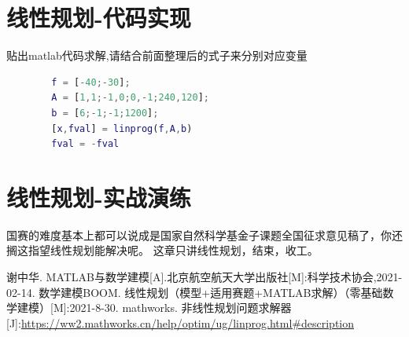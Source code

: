 \documentclass[a4paper,20pt]{article}
\begin{document}
\section{线性规划-代码实现}
\par 贴出matlab代码求解,请结合前面整理后的式子来分别对应变量
\begin{center}
    \begin{lstlisting}[caption={Linprog},language=Matlab]
        % Linear Programming
        f = [-40;-30];  
        A = [1,1;-1,0;0,-1;240,120];   
        b = [6;-1;-1;1200];             
        [x,fval] = linprog(f,A,b)
        fval = -fval
        \end{lstlisting}
\end{center}
\section{线性规划-实战演练}
\par 国赛的难度基本上都可以说成是国家自然科学基金子课题全国征求意见稿了，你还搁这指望线性规划能解决呢。
这章只讲线性规划，结束，收工。
\newpage
\begin{thebibliography}{99}

    谢中华. MATLAB与数学建模[A].北京航空航天大学出版社[M]:科学技术协会,2021-02-14.
    数学建模BOOM. 线性规划（模型+适用赛题+MATLAB求解）（零基础数学建模）[M]:2021-8-30.
    mathworks. 非线性规划问题求解器[J]:\url{https://ww2.mathworks.cn/help/optim/ug/linprog.html#description}

\end{thebibliography}
\newpage
\end{document}
